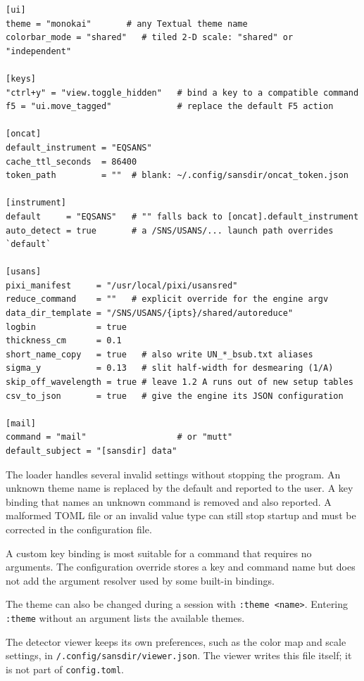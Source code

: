 \documentclass[tm]{ornltm}
\newcommand{\hme}{\raisebox{0.4ex}{\texttildelow}}
\begin{document}
\begin{lstlisting}
[ui]
theme = "monokai"       # any Textual theme name
colorbar_mode = "shared"   # tiled 2-D scale: "shared" or "independent"

[keys]
"ctrl+y" = "view.toggle_hidden"   # bind a key to a compatible command
f5 = "ui.move_tagged"             # replace the default F5 action

[oncat]
default_instrument = "EQSANS"
cache_ttl_seconds  = 86400
token_path         = ""  # blank: ~/.config/sansdir/oncat_token.json

[instrument]
default     = "EQSANS"   # "" falls back to [oncat].default_instrument
auto_detect = true       # a /SNS/USANS/... launch path overrides `default`

[usans]
pixi_manifest     = "/usr/local/pixi/usansred"
reduce_command    = ""   # explicit override for the engine argv
data_dir_template = "/SNS/USANS/{ipts}/shared/autoreduce"
logbin            = true
thickness_cm      = 0.1
short_name_copy   = true   # also write UN_*_bsub.txt aliases
sigma_y           = 0.13   # slit half-width for desmearing (1/A)
skip_off_wavelength = true # leave 1.2 A runs out of new setup tables
csv_to_json       = true   # give the engine its JSON configuration

[mail]
command = "mail"                  # or "mutt"
default_subject = "[sansdir] data"
\end{lstlisting}

The loader handles several invalid settings without stopping the program. An
unknown theme name is replaced by the default and reported to the user. A key
binding that names an unknown command is removed and also reported. A malformed
TOML file or an invalid value type can still stop startup and must be corrected
in the configuration file.

A custom key binding is most suitable for a command that requires no arguments.
The configuration override stores a key and command name but does not add the
argument resolver used by some built-in bindings.

The theme can also be changed during a session with
\texttt{:theme <name>}. Entering \texttt{:theme} without an argument lists the
available themes.

The detector viewer keeps its own preferences, such as the color map and scale
settings, in \texttt{\hme/.config/sansdir/viewer.json}. The viewer writes this
file itself; it is not part of \texttt{config.toml}.

\end{document}
